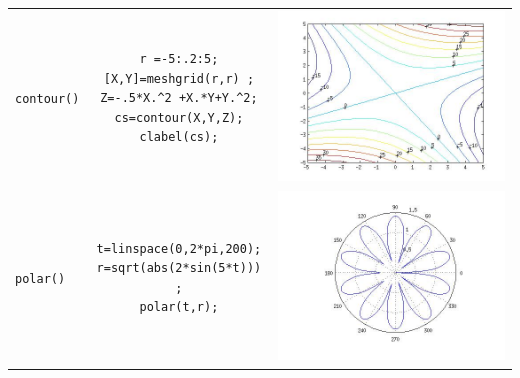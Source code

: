 \documentclass[letter,11pt]{article}
\newcommand\0{\mathbf{0}}
\begin{document}
\begin{center}
\begin{longtable}{||l|c|c||}
\begin{minipage}{0.3\textwidth}
\end{minipage}
\\
\hline
  \texttt{contour()}		& 
\begin{minipage}{3in}
\begin{verbatim}
r =-5:.2:5;
[X,Y]=meshgrid(r,r) ;
Z=-.5*X.^2 +X.*Y+Y.^2;
cs=contour(X,Y,Z);
clabel(cs);
\end{verbatim}
\end{minipage} 
&
\begin{minipage}{0.3\textwidth}
\includegraphics[width=\textwidth]{./ej3.jpg}
\end{minipage}
\\
\hline
  \texttt{polar()}		& 
\begin{minipage}{3in}
\begin{verbatim}
t=linspace(0,2*pi,200);
r=sqrt(abs(2*sin(5*t))) ;
polar(t,r);
\end{verbatim}
\end{minipage} 
&
\begin{minipage}{0.3\textwidth}
\includegraphics[width=\textwidth]{./ej4.jpg}

\end{minipage}
\end{longtable}
\end{center}
\end{document}
